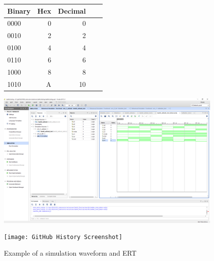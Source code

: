 \documentclass[11pt]{article}
\begin{document}
\begin{figure}[ht]\centering
	\begin{tabular}{l|rrrr}
		Binary & Hex & Decimal \\
		\midrule
		0000 & 0 & 0 \\
		0010 & 2 & 2 \\
		0100 & 4 & 4 \\
		0110 & 6 & 6 \\
		1000 & 8 & 8 \\
		1010 & A & 10 \\
		\bottomrule
	\end{tabular}\medskip
	
	\includegraphics[trim=7.3in 6.2in .2in 1.75in,clip,width=6in]{lab1_example_screenshot.PNG}
	\caption{Example of a simulation waveform and ERT}
	\label{fig:sim_with_table}
	
	\texttt{[image: GitHub History Screenshot]}
	
\end{figure}
\end{document}
